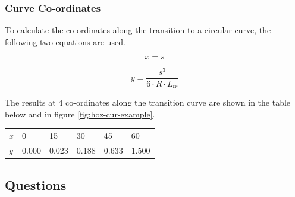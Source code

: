 \documentclass{bcrre_exam}
\begin{document}
\subsubsection*{Curve Co-ordinates}

To calculate the co-ordinates along the transition to a circular curve, the following two equations are used.

\begin{equation}
    x=s
\end{equation}

\begin{equation}
    y=\frac{s^3}{6 \cdot R \cdot L_{tr}}
\end{equation}

The results at 4 co-ordinates along the transition curve are shown in the table below and in figure \ref{fig:hoz-cur-example}.

\begin{table}[h]
\centering
\begin{tabular}{@{}llllll@{}}
\toprule
$x$ & \num{0}     & \num{15}    & \num{30}    & \num{45}    & \num{60}    \\ 
$y$ & \num{0.000} & \num{0.023} & \num{0.188} & \num{0.633} & \num{1.500} \\ \bottomrule
\end{tabular}
\end{table}

\subsection*{Questions}
\end{document}
